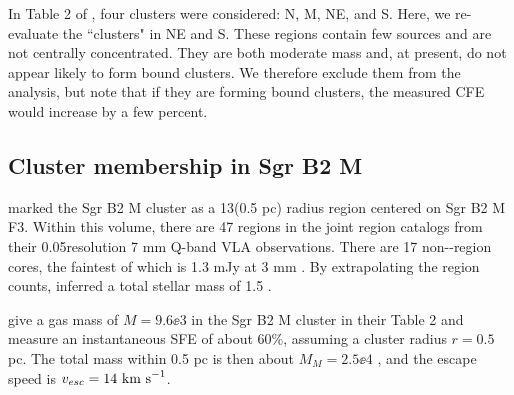 \documentclass[twocolumn]{aastex62}
\begin{document}
In Table 2 of \citet{Ginsburg2018a}, four clusters were considered: N, M, NE, and
S.  Here, we re-evaluate the ``clusters" in NE and S.  These regions contain
few sources and are not centrally concentrated.
They are both moderate mass and, at present, do not appear likely to form bound
clusters.  We therefore exclude them from the analysis, but note that if they
are forming bound clusters, the measured CFE would increase by a few percent.



\subsection{Cluster membership in Sgr B2 M}
\label{sec:mmass}
\citet{Schmiedeke2016a} marked the Sgr B2 M cluster as a 13\arcsec  (0.5 pc) radius
region centered on Sgr B2 M F3.  Within this volume, there are 47 \hii regions
in the joint  \hii region catalogs \citep{Gaume1995a,De-Pree2015a} from their
0.05\arcsec resolution 7 mm Q-band
VLA observations.  There are 17 non-\hii-region cores, the faintest of which is
1.3 mJy at 3 mm \citep{Ginsburg2018a}.  By extrapolating the \hii region counts,
\citet{Ginsburg2018a} inferred a total stellar mass of 1.5 \msun.

% 


\citet{Schmiedeke2016a} give a gas mass of $M=9.6\ee{3}$ \msun in the Sgr B2 M
cluster in their Table 2 and measure an instantaneous SFE of about 60\%, assuming
a cluster radius $r=0.5$ pc.  The total mass within 0.5 pc is then about $M_M =
2.5\ee{4}$ \msun, and the escape speed is $v_{esc}=14~\textrm{km~s}^{-1}$.
\end{document}
